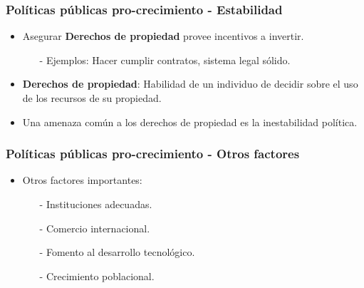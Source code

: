 \documentclass{beamer}
\begin{document}
\begin{frame}
\frametitle{Pol\'iticas p\'ublicas pro-crecimiento - Estabilidad}
\begin{itemize}
\setlength\itemsep{1.4em}
\item Asegurar \textbf{Derechos de propiedad} provee incentivos a invertir.\\
\begin{itemize}
\item[-] Ejemplos: Hacer cumplir contratos, sistema legal s\'olido.
\end{itemize}
\item \textbf{Derechos de propiedad}: Habilidad de un individuo de decidir sobre el uso de los recursos de su propiedad.
\item Una amenaza com\'un a los derechos de propiedad es la inestabilidad pol\'itica.
\end{itemize}
\end{frame}

\begin{frame}
\frametitle{Pol\'iticas p\'ublicas pro-crecimiento - Otros factores}
\begin{itemize}
\item Otros factores importantes:\\
\vspace{2mm}
\begin{itemize}
\setlength\itemsep{1.4em}
\item[-] Instituciones adecuadas.
\item[-] Comercio internacional.
\item[-] Fomento al desarrollo tecnol\'ogico.
\item[-] Crecimiento poblacional.
\end{itemize}
\end{itemize}
\end{frame}
\end{document}
